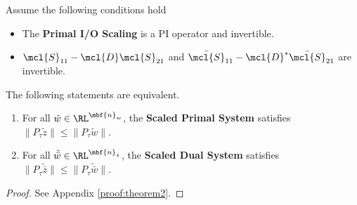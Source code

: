 \begin{theorem}\label{thm:dualscaledIO}
	Assume the following conditions hold
	\begin{itemize}
		\item The \textbf{Primal I/O Scaling} is a PI operator and invertible.
		\item $\mcl{S}_{11} - \mcl{D}\mcl{S}_{21}$ and $\bar{\mcl{S}}_{11} - \mcl{D}^*\bar{\mcl{S}}_{21}$ are invertible.
	\end{itemize}
	The following statements are equivalent.
	\begin{enumerate}
		\item For all $\tilde{w}\in\RL^{\mbf{n}_w}$, the \textbf{Scaled Primal System}
		      satisfies $\|P_\tau\tilde{z}\| \leq \|P_\tau\tilde{w}\|$.
		\item For all $\tilde{\bar{w}}\in\RL^{\mbf{n}_z}$, the \textbf{Scaled Dual System}
		      satisfies $\|P_\tau\tilde{\bar{z}}\| \leq \|P_\tau\tilde{\bar{w}}\|$.
	\end{enumerate}
\end{theorem}
\begin{proof}
	See Appendix \ref{proof:theorem2}.
\end{proof}
